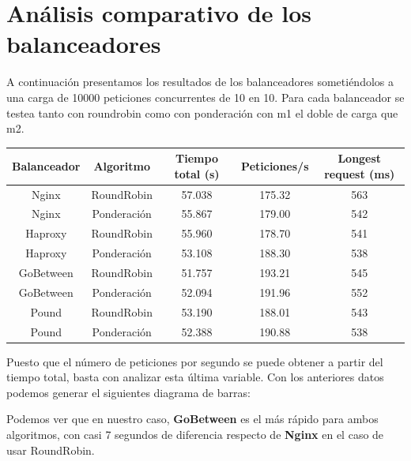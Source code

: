 \documentclass[twoside]{article}
\begin{document}
\section{Análisis comparativo de los balanceadores}
A continuación presentamos los resultados de los balanceadores sometiéndolos a una carga de 10000 peticiones concurrentes de 10 en 10. Para cada balanceador se testea tanto con roundrobin como con ponderación con m1 el doble de carga que m2.
 \begin{center}
    \begin{tabular}{|c|c|c|c|c|}
        \hline
        Balanceador & Algoritmo & Tiempo total (s) & Peticiones/s & Longest request (ms) \\
        \hline
        Nginx & RoundRobin & 57.038 & 175.32 & 563 \\
        \hline
        Nginx & Ponderación & 55.867 & 179.00 & 542 \\
        \hline
        Haproxy & RoundRobin & 55.960 & 178.70 & 541 \\
        \hline
        Haproxy & Ponderación & 53.108 & 188.30 & 538 \\
        \hline
        GoBetween & RoundRobin & 51.757 & 193.21 & 545 \\
        \hline
        GoBetween & Ponderación & 52.094 & 191.96 & 552 \\
        \hline
        Pound & RoundRobin & 53.190 & 188.01 & 543 \\
        \hline
        Pound & Ponderación & 52.388 & 190.88 & 538 \\
        \hline
    \end{tabular}
 \end{center}

Puesto que el número de peticiones por segundo se puede obtener a partir del tiempo total, basta con analizar esta última variable. Con los anteriores datos podemos generar el siguientes diagrama de barras:
\begin{center}
\end{center}
Podemos ver que en nuestro caso, \textbf{GoBetween} es el más rápido para ambos algoritmos, con casi 7 segundos de diferencia respecto de \textbf{Nginx} en el caso de usar RoundRobin.
\end{document}

